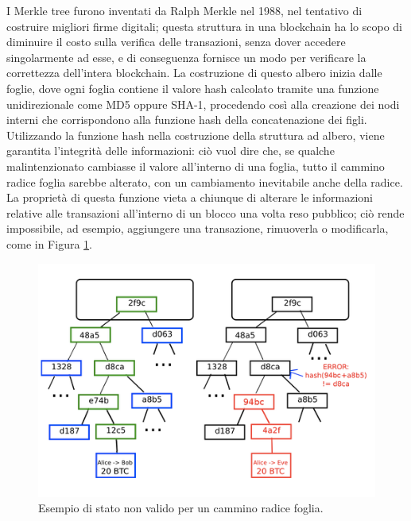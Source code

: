 I Merkle tree furono inventati da Ralph Merkle nel 1988, nel tentativo di costruire migliori firme digitali; questa struttura in una blockchain ha lo scopo di diminuire il costo sulla verifica delle transazioni, senza dover accedere singolarmente ad esse, e di conseguenza fornisce un modo per verificare la correttezza dell’intera blockchain.
La costruzione di questo albero inizia dalle foglie, dove ogni foglia contiene il valore hash calcolato tramite una funzione unidirezionale come MD5 oppure SHA-1, procedendo così alla creazione dei nodi interni che corrispondono alla funzione hash della concatenazione dei figli.
Utilizzando la funzione hash nella costruzione della struttura ad albero, viene garantita l’integrità delle informazioni: ciò vuol dire che, se qualche malintenzionato cambiasse il valore all’interno di una foglia, tutto il cammino radice foglia sarebbe alterato, con un cambiamento inevitabile anche della radice.
La proprietà di questa funzione vieta a chiunque di alterare le informazioni relative alle transazioni all’interno di un blocco una volta reso pubblico; ciò rende impossibile, ad esempio, aggiungere una transazione, rimuoverla o modificarla, come in Figura \ref{fig:merkletree}.

\begin{figure}[H]
\begin{center}
\includegraphics[width=0.6\columnwidth]{images/image-merkle-treepng.png}
\end{center}
\caption{Esempio di stato non valido per un cammino radice foglia. \cite{ethereum:paper}}
\label{fig:merkletree}
\end{figure}
